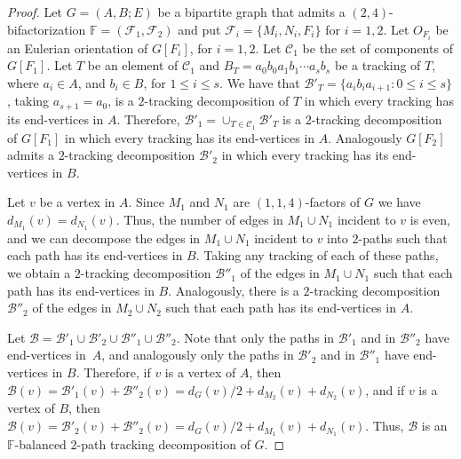 \documentclass[12pt,reqno,a4paper]{amsart}
\newcommand{\D}{\mathcal{D}}
\newcommand{\B}{\mathcal{B}}
\begin{document}
\begin{proof}
	Let \(G = (A,B;E)\) be a bipartite graph 
	that admits a \((2,4)\)-bifactorization
	\(\mathbb{F} = (\mathcal{F}_1,\mathcal{F}_2)\) and put \(\mathcal{F}_i 
= 
\{M_i,N_i,F_i\}\) for \(i = 1,2\).
	Let \(O_{F_i}\) be an Eulerian orientation of \(G[F_i]\), for \(i = 1,2\).
	Let \(\mathcal{C}_1\) be the set of components of \(G[F_1]\).
	Let \(T\) be an element of \(\mathcal{C}_1\) and \(B_T = a_0b_0a_1b_1\cdots a_sb_s\) 
	be a tracking of \(T\), where \(a_i \in A\), and \(b_i \in B\), for \(1\leq i\leq s\).
	We have that \(\B'_T = \{a_ib_ia_{i+1}\colon 0\leq i\leq s\}\),
	taking \(a_{s+1} = a_0\), is a \(2\)-tracking decomposition of \(T\)
	in which every tracking has its end-vertices in \(A\).
	Therefore, \(\B'_1 = \cup_{T\in\mathcal{C}_1}\B'_T\) is a 
	\(2\)-tracking decomposition of \(G[F_1]\) in which every tracking has its end-vertices in \(A\).
	Analogously \(G[F_2]\) admits a \(2\)-tracking decomposition \(\B'_2\) in which every tracking
	has its end-vertices in \(B\).

	Let \(v\) be a vertex in \(A\).
	Since \(M_1\) and \(N_1\) are \((1,1,4)\)-factors of \(G\) we have \(d_{M_1}(v) = d_{N_1}(v)\).
	Thus, the number of edges in \(M_1\cup N_1\) incident to \(v\) is even,
	and we can decompose the edges in \(M_1\cup N_1\) incident to \(v\) 
	into \(2\)-paths such that each path has its end-vertices in \(B\).
	Taking any tracking of each of these paths, we obtain a \(2\)-tracking decomposition \(\B''_1\) 
	of the edges in \(M_1\cup N_1\) 
	such that each path has its end-vertices in \(B\).
	Analogously, there is a \(2\)-tracking decomposition \(\B''_2\) of the edges in \(M_2\cup N_2\) 
	such that each path has its end-vertices in \(A\).
	
	Let \(\B = \B'_1\cup\B'_2\cup\B''_1\cup\B''_2\).
	Note that only the paths in \(\B'_1\) and in \(\B''_2\) have end-vertices
	in~\(A\),
	and analogously
	only the paths in \(\B'_2\) and in \(\B''_1\) have end-vertices in \(B\).
	Therefore, if \(v\) is a vertex of \(A\), 
	then \(\B(v) = \B'_1(v) + \B''_2(v) 
		= d_G(v)/2 + d_{M_2}(v) + d_{N_2}(v)\),
	and	if \(v\) is a vertex of \(B\), 
	then \(\B(v) = \B'_2(v) + \B''_2(v) 
		= d_G(v)/2 + d_{M_1}(v) + d_{N_1}(v)\).
	Thus, \(\B\) is an \(\mathbb{F}\)-balanced $2$-path tracking decomposition of \(G\).
	
\end{proof}
\end{document}
